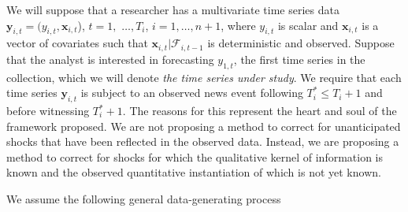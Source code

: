 \documentclass[11pt]{article}
\newcommand{\y}{\textbf{y}}
\newcommand{\x}{\textbf{x}}
\theoremstyle{definition}
\begin{document}
We will suppose that a researcher has a multivariate time series data $\y_{i,t} = (y_{i,t}, \x_{i,t}$), $t = 1,$ $\ldots,  T_i$, $i = 1, \ldots, n+1$, where $y_{i,t}$ is scalar and $\x_{i,t}$ is a vector of covariates such that $\x_{i,t}|\mathcal{F}_{i,t-1}$ is deterministic and observed.  Suppose that the analyst is interested in forecasting $y_{1,t}$, the first time series in the collection, which we will denote \textit{the time series under study}.   We require that each time series $\y_{i,t}$ is subject to an observed news event following $T^*_i \leq T_{i} + 1$ and before witnessing $T^*_i+1$.  The reasons for this represent the heart and soul of the framework proposed.  We are not proposing a method to correct for unanticipated shocks that have been reflected in the observed data.  Instead, we are proposing a method to correct for shocks for which the qualitative kernel of information is known and the observed quantitative instantiation of which is not yet known. 

We assume the following general data-generating process
\end{document}
